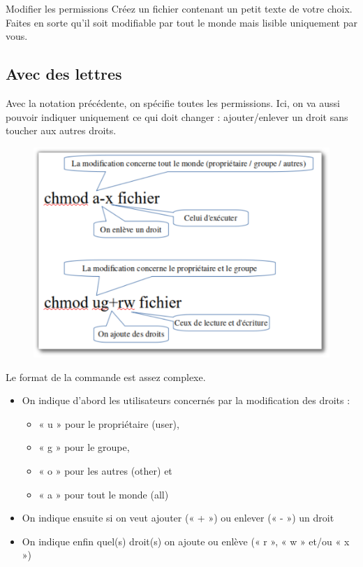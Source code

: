 \documentclass[a4paper,11pt]{style-esi/td}
\begin{document}
			\begin{Exercice}{Modifier les permissions}
				Créez un fichier  
				contenant un petit texte de votre choix.
				Faites en sorte qu'il soit modifiable par tout le monde
				mais lisible uniquement par vous.
			\end{Exercice}

		\subsection{Avec des lettres}

			Avec la notation précédente, on spécifie toutes les permissions. 
			Ici, on va aussi pouvoir indiquer uniquement ce qui doit changer : 
			ajouter/enlever un droit sans toucher aux autres droits.

			\begin{figure}
				\vspace{-1em}
				\includegraphics[width=.4\textwidth]{image/chmod.pdf}
				\vspace{-2em}
			\end{figure}
			Le format de la commande est assez complexe. 
			\begin{itemize}
			\item
				On indique d'abord les utilisateurs concernés par la modification des droits :
				\begin{itemize}
				\item « u » pour le propriétaire (user), 
				\item « g » pour le groupe, 
				\item « o » pour les autres (other) et
				\item « a » pour tout le monde (all)
				\end{itemize}  
			\item
				On indique ensuite si on veut ajouter (« + ») 
				ou enlever (« - ») un droit
			\item 
				On indique enfin quel(s) droit(s) on ajoute ou enlève 
				(« r », « w » et/ou « x »)
			\end{itemize}
\end{document}

